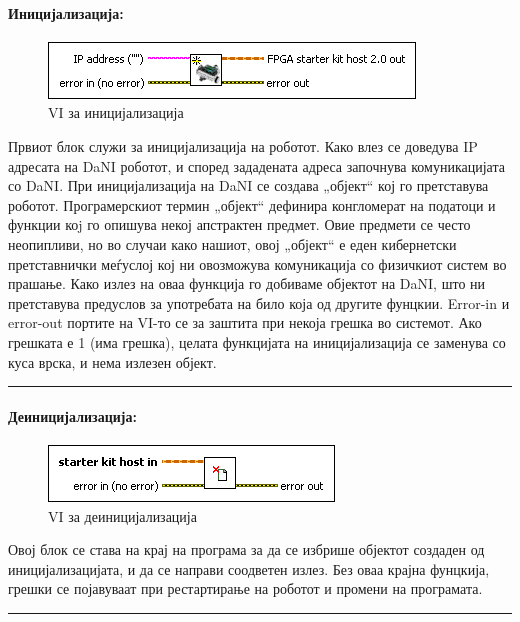 \documentclass[11pt]{article}
\begin{document}
		\paragraph{Иницијализација:\\}
			\begin{figure}[h]
				\includegraphics[width=0.55\linewidth]{./images/init.png}
				\raggedright
				\caption{VI за иницијализација}
				\label{fig:init.png}
				\end{figure}
		  Првиот блок служи за иницијализација на роботот. Како влез се доведува IP адресата на DaNI роботот, и според зададената адреса започнува комуникацијата со DaNI. При иницијализација на DaNI се создава „објект“ кој го претставува роботот. Програмерскиот термин „објект“ дефинира конгломерат на податоци и функции коj го опишува некој апстрактен предмет. Овие предмети се често неопипливи, но во случаи како нашиот, овој „објект“ е еден кибернетски претставнички меѓуслој кој ни овозможува комуникација со физичкиот систем во прашање. Како излез на оваа функција го добиваме објектот на DaNI, што ни претставува предуслов за употребата на било која од другите фунцкии. Error-in и error-out портите на VI-то се за заштита при некоја грешка во системот. Ако грешката е 1 (има грешка), целата функцијата на иницијализација се заменува со куса врска, и нема излезен објект.
      \\
      \textcolor[RGB]{150,150,150}{\rule{\linewidth}{1.6pt}}

    \paragraph{Деиницијализација:\\}
    	\begin{figure}[h]
        \includegraphics[width = 0.55\linewidth]{./images/deinit.png}
				\raggedright
				\caption{VI за деиницијализација}
				\label{fig:deinit.png}
				\end{figure}
      Овој блок се става на крај на програма за да се избрише објектот создаден од иницијализацијата, и да се направи соодветен излез. Без оваа крајна фунцкија, грешки се појавуваат при рестартирање на роботот и промени на програмата.\\
      \textcolor[RGB]{150,150,150}{\rule{\linewidth}{1.6pt}}
\end{document}

